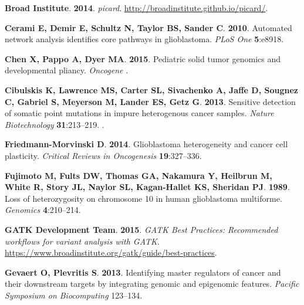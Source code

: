 \documentclass[11 pt]{article} %
\begin{document}
\begin{thebibliography}{31}
\textbf{{Broad Institute}}. \textbf{2014}.
\newblock \emph{picard}.
\newblock \urlprefix\url{http://broadinstitute.github.io/picard/}.

\textbf{Cerami E, Demir E, Schultz N, Taylor BS, Sander C}. \textbf{2010}.
\newblock Automated network analysis identifies core pathways in glioblastoma.
\newblock \emph{PLoS One} \textbf{5}:e8918.

\textbf{Chen X, Pappo A, Dyer MA}. \textbf{2015}.
\newblock Pediatric solid tumor genomics and developmental pliancy.
\newblock \emph{Oncogene} .

\textbf{Cibulskis K, Lawrence MS, Carter SL, Sivachenko A, Jaffe D, Sougnez C,
  Gabriel S, Meyerson M, Lander ES, Getz G}. \textbf{2013}.
\newblock Sensitive detection of somatic point mutations in impure heterogenous
  cancer samples.
\newblock \emph{Nature Biotechnology} \textbf{31}:213--219.
\newblock {}.

\textbf{Friedmann-Morvinski D}. \textbf{2014}.
\newblock Glioblastoma heterogeneity and cancer cell plasticity.
\newblock \emph{Critical Reviews in Oncogenesis} \textbf{19}:327--336.

\textbf{Fujimoto M, Fults DW, Thomas GA, Nakamura Y, Heilbrun M, White R, Story
  JL, Naylor SL, Kagan-Hallet KS, Sheridan PJ}. \textbf{1989}.
\newblock Loss of heterozygosity on chromosome 10 in human glioblastoma
  multiforme.
\newblock \emph{Genomics} \textbf{4}:210--214.

\textbf{{GATK Development Team}}. \textbf{2015}.
\newblock \emph{{GATK Best Practices: Recommended} workflows for variant
  analysis with {GATK}}.
\newblock
  \urlprefix\url{https://www.broadinstitute.org/gatk/guide/best-practices}.

\textbf{Gevaert O, Plevritis S}. \textbf{2013}.
\newblock Identifying master regulators of cancer and their downstream targets
  by integrating genomic and epigenomic features.
\newblock \emph{Pacific Symposium on Biocomputing} 123--134.


\end{thebibliography}
\end{document}
